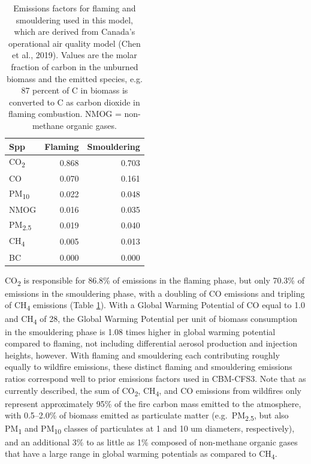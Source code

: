 \documentclass[, manuscript]{copernicus}
\begin{document}
\begin{table}
\centering
\caption{\label{tab:tab-globalVarsEmissions}Emissions factors for flaming and smouldering used in this model, which are derived from Canada's operational air quality model (Chen et al., 2019). Values are the molar fraction of carbon in the unburned biomass and the emitted species, e.g. 87 percent of C in biomass is converted to C as carbon dioxide in flaming combustion. NMOG = non-methane organic gases.}
\centering
\begin{tabular}[t]{l|r|r}
\hline
Spp & Flaming & Smouldering\\
\hline
CO\textsubscript{2} & 0.868 & 0.703\\
\hline
CO & 0.070 & 0.161\\
\hline
PM\textsubscript{10} & 0.022 & 0.048\\
\hline
NMOG & 0.016 & 0.035\\
\hline
PM\textsubscript{2.5} & 0.019 & 0.040\\
\hline
CH\textsubscript{4} & 0.005 & 0.013\\
\hline
BC & 0.000 & 0.000\\
\hline
\end{tabular}
\end{table}

CO\textsubscript{2} is responsible for 86.8\% of emissions in the
flaming phase, but only 70.3\% of emissions in the smouldering phase,
with a doubling of CO emissions and tripling of CH\textsubscript{4}
emissions (Table \ref{tab:tab-globalVarsEmissions}). With a Global
Warming Potential of CO equal to 1.0 and CH\textsubscript{4} of 28, the
Global Warming Potential per unit of biomass consumption in the
smouldering phase is 1.08 times higher in global warming potential
compared to flaming, not including differential aerosol production and
injection heights, however. With flaming and smouldering each
contributing roughly equally to wildfire emissions, these distinct
flaming and smouldering emissions ratios correspond well to prior
emissions factors used in CBM-CFS3. Note that as currently described,
the sum of CO\textsubscript{2}, CH\textsubscript{4}, and CO emissions
from wildfires only represent approximately 95\% of the fire carbon mass
emitted to the atmosphere, with 0.5--2.0\% of biomass emitted as
particulate matter (e.g.~PM\textsubscript{2.5}, but also
PM\textsubscript{1} and PM\textsubscript{10} classes of particulates at
1 and 10 um diameters, respectively), and an additional 3\%
\citep{hayden2022} to as little as 1\% \citep{simon2010} composed of
non-methane organic gases that have a large range in global warming
potentials as compared to CH\textsubscript{4}.
\end{document}
